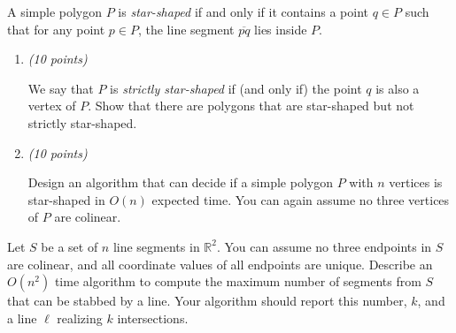 \documentclass{article}
\newcommand{\withpoints}[1]{%
  \addtocounter{pointscounter}{#1} \printpoints{#1}
}
\newcommand{\printpoints}[1]{%
   \ifthenelse{#1 = 0}
              {}
              {\textit{(#1 points)}}\mbox{}
}
\newenvironment{question}[1][0]{\begin{tcolorbox}[parbox=false
                                      ,breakable=true
                                      ,enhanced jigsaw
                                      ,title=\bfseries Question
                                      \stepcounter{questionscounter}\arabic{questionscounter}
                                      \withpoints{#1}]
                         }
                         {\end{tcolorbox}}
\newenvironment{subquestions}{\begin{enumerate}[leftmargin=*
                                        ]}
                             {\end{enumerate}}
\newcommand{\subquestion}[1][0]{\item \withpoints{#1}}
\newcommand{\mkmbb}[1]{\ensuremath{\mathbb{#1}}\xspace}
\newcommand{\R}{\mkmbb{R}}
\begin{document}
  \begin{question}
    A simple polygon $P$ is \emph{star-shaped} if and only if it
    contains a point $q \in P$ such that for any point $p \in P$, the line segment
    $\overline{pq}$ lies inside $P$.
    \begin{subquestions}
      \subquestion[10] We say that $P$ is \emph{strictly star-shaped} if (and only
      if) the point $q$ is also a vertex of $P$. Show that there are polygons
      that are star-shaped but not strictly star-shaped.

      \subquestion[10] Design an algorithm that can decide if a simple polygon $P$
      with $n$ vertices is star-shaped in $O(n)$ expected time. You can again
      assume no three vertices of $P$ are colinear.
    \end{subquestions}
  \end{question}

  \begin{question}[20]
    Let $S$ be a set of $n$ line segments in $\R^2$. You can assume no
    three endpoints in $S$ are colinear, and all coordinate values of
    all endpoints are unique. Describe an $O(n^2)$ time algorithm to
    compute the maximum number of segments from $S$ that can be
    stabbed by a line. Your algorithm should report this number, $k$,
    and a line $\ell$ realizing $k$ intersections.
  \end{question}
\end{document}

